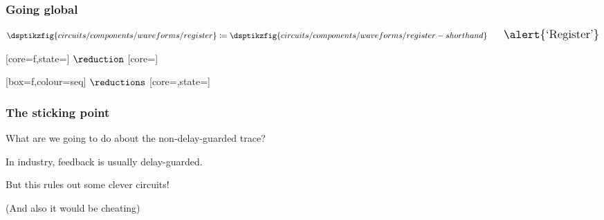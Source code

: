 \begin{frame}
    \frametitle{Going global}

    \centering
    \Large

    \await

    \normalsize
    \begin{gather*}
        \dsptikzfig{circuits/components/waveforms/register}
        \coloneqq
        \dsptikzfig{circuits/components/waveforms/register-shorthand}
        \qquad
        \Large
        \text{\alert{`Register'}}
    \end{gather*}

    \vspace{1em}

    \await

    [core=f,state=]
    \Large\(\reduction\)\normalsize
    [core=]

    \await

    [box=f,colour=seq]
    \Large\(\reductions\)\normalsize
    [core=,state=]

\end{frame}
\begin{frame}
    \frametitle{The sticking point}

    \centering

    \Large

    What are we going to do about the non-delay-guarded trace?

    \await

    In industry, feedback is usually \alert{delay-guarded}.

    \await

    But this rules out some \alert{clever} circuits!

    \normalsize

    \vspace{1em}


    \await

    \vspace{1em}

    \scriptsize
    (And also it would be cheating)

\end{frame}
